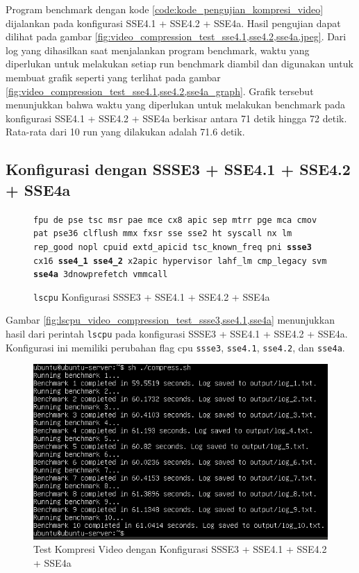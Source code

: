 Program benchmark dengan kode \ref{code:kode_pengujian_kompresi_video} dijalankan pada konfigurasi SSE4.1 + SSE4.2 + SSE4a. Hasil pengujian dapat dilihat pada gambar \ref{fig:video_compression_test_sse4.1,sse4.2,sse4a.jpeg}. Dari log yang dihasilkan saat menjalankan program benchmark, waktu yang diperlukan untuk melakukan setiap run benchmark diambil dan digunakan untuk membuat grafik seperti yang terlihat pada gambar \ref{fig:video_compression_test_sse4.1,sse4.2,sse4a_graph}. Grafik tersebut menunjukkan bahwa waktu yang diperlukan untuk melakukan benchmark pada konfigurasi SSE4.1 + SSE4.2 + SSE4a berkisar antara 71 detik hingga 72 detik. Rata-rata dari 10 run yang dilakukan adalah 71.6 detik.

\subsection{Konfigurasi dengan SSSE3 + SSE4.1 + SSE4.2 + SSE4a}
\begin{figure}
    \texttt{fpu de pse tsc msr pae mce cx8 apic sep mtrr pge mca cmov pat pse36 clflush mmx fxsr sse sse2 ht syscall nx lm rep\_good nopl cpuid extd\_apicid tsc\_known\_freq pni \textbf{ssse3} cx16 \textbf{sse4\_1} \textbf{sse4\_2} x2apic hypervisor lahf\_lm cmp\_legacy svm \textbf{sse4a} 3dnowprefetch vmmcall}
    \caption{\texttt{lscpu} Konfigurasi SSSE3 + SSE4.1 + SSE4.2 + SSE4a}
    \label{fig:lscpu_video_compression_test_ssse3,sse4.1,sse4.2,sse4a.jpeg}
\end{figure}

Gambar \ref{fig:lscpu_video_compression_test_ssse3,sse4.1,sse4a} menunjukkan hasil dari perintah \texttt{lscpu} pada konfigurasi SSSE3 + SSE4.1 + SSE4.2 + SSE4a. Konfigurasi ini memiliki perubahan flag cpu \texttt{ssse3}, \texttt{sse4.1}, \texttt{sse4.2}, dan \texttt{sse4a}.

\begin{figure}
    \centering
    \includegraphics[width=1\textwidth]
    {assets/pics/video-compression-test/ssse3,sse4.1,sse4.2,sse4a.jpeg}
    \caption{Test Kompresi Video dengan Konfigurasi SSSE3 + SSE4.1 + SSE4.2 + SSE4a}
    \label{fig:video_compression_test_ssse3,sse4.1,sse4.2,sse4a.jpeg}
\end{figure}

